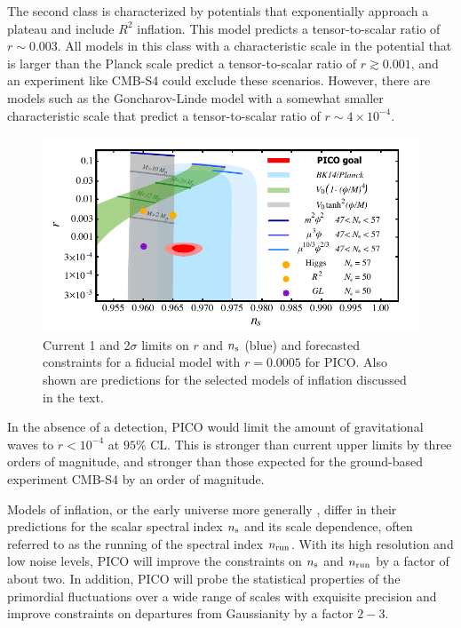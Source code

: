 \documentclass[PICOReport.tex]{subfiles}
\begin{document}
The second class is characterized by potentials that exponentially approach a plateau  and include $R^2$ inflation. This model predicts a tensor-to-scalar ratio 
of $r\sim 0.003$. All models in this class with a characteristic scale in the potential that is larger 
than the Planck scale predict a tensor-to-scalar ratio
of $r\gtrsim 0.001$,  and an experiment like CMB-S4 could 
exclude these scenarios. 
However, there are models such as the Goncharov-Linde model with a somewhat smaller 
characteristic scale that predict a tensor-to-scalar ratio of $r\sim 4\times 10^{-4}$. 
\begin{figure}[!htb]
\parbox{4.5in}{\centerline{
\includegraphics[width=4.5in]{images/nsrlabeledrp0005_PICOv4p1.pdf}}}
\parbox{1.8in}{
\caption{Current 1 and 2$\sigma$ limits on $r$ and $n_{\rm s}$ (blue) and forecasted constraints for a fiducial model with $r = 0.0005$ for PICO. Also shown are predictions for the selected models of inflation discussed in the text.
}
\label{fig:nsr}}
\end{figure}

In the absence of a detection, PICO would limit the amount of gravitational waves to 
$r<10^{-4}$ at $95\%$ CL. This is stronger than current upper limits by three orders of magnitude, 
and stronger than those expected for the ground-based experiment CMB-S4 by an order of magnitude. 

Models of inflation, or the early universe more generally , 
differ in their predictions for the scalar spectral index $n_{\rm s}$ and its scale dependence, 
often referred to as the running of the spectral index $n_{\rm run}$. With its high resolution 
and low noise levels, PICO will improve the constraints on $n_{\rm s}$ and $n_{\rm run}$ by a factor 
of about two. In addition, PICO will probe the statistical properties of the primordial fluctuations 
over a wide range of scales with exquisite precision and improve constraints on departures from 
Gaussianity by a factor $2-3$.
\end{document}
